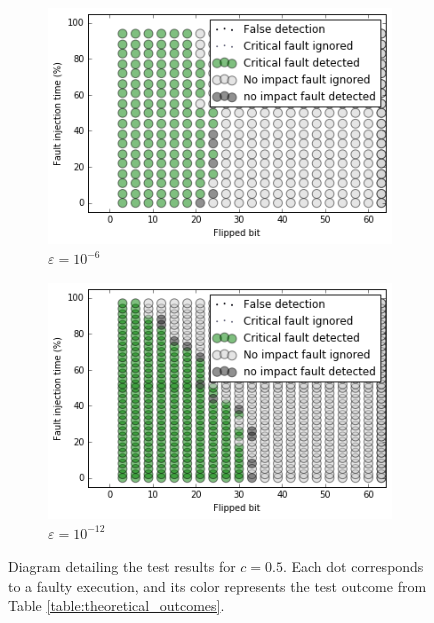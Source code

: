 \begin{figure}[h]
\begin{minipage}[b]{0.48\linewidth}
	\begin{subfigure}[t]{\linewidth}
		\centering
		\includegraphics[width=1.1\linewidth]{figures/pores_2/test_result_c05_oracle_0.png}
		\caption{$\varepsilon = 10^{-6}$}\label{fig:pores_2_test_result_c05_oracle_0}	
	\end{subfigure}
    \quad
    \begin{subfigure}[t]{\linewidth}
		\centering
		\includegraphics[width=1.1\linewidth]{figures/pores_2/test_result_c05_oracle_1.png}
		\caption{$\varepsilon = 10^{-12}$}\label{fig:pores_2_test_result_c05_oracle_1}	
	\end{subfigure}

	\end{minipage}
\caption{Diagram detailing the test results for $c = 0.5$. Each dot corresponds to a faulty execution, and its color represents the test outcome from Table \ref{table:theoretical_outcomes}.}
\label{fig:test_result_oracle_c05}
\end{figure}










